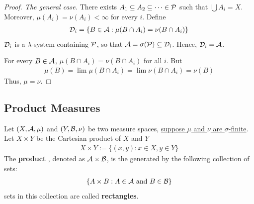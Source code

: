 \documentclass[11pt]{article}
\begin{document}
	\begin{proof}[Proof. The general case]
		There exists $A_1 \subseteq A_2 \subseteq \dots \in \mathcal{{P}}$ such that $\bigcup A_i = X$.
		Moreover, $\mu(A_i) = \nu(A_i) < \infty$ for every $i$.
		Define
		\begin{align}
			\mathcal{{D}}_i = \{B \in \mathcal{{A}} : \mu(B \cap A_i) = \nu(B \cap A_i)\}
		\end{align}
		$\mathcal{{D}}_i$ is a $\lambda$-system containing $\mathcal{{P}}$, so that $\mathcal{{A}} = \sigma(\mathcal{{P}}) \subseteq \mathcal{{D}}_i$. Hence, $\mathcal{{D}}_i = \mathcal{{A}}$.
		
		For every $B \in \mathcal{{A}}$, $\mu(B \cap A_i) = \nu(B \cap A_i)$ for all $i$. But
		\begin{align}
			\mu(B) = \lim \mu(B \cap A_i) = \lim \nu(B \cap A_i) = \nu(B)
		\end{align}
		Thus, $\mu = \nu$.
	\end{proof}
	
	\subsection{Product Measures}
	\begin{definition}
		Let $(X, \mathcal{{A}}, \mu)$ and $(Y, \mathcal{{B}}, \nu)$ be two measure spaces, \ul{suppose $\mu$ and $\nu$ are $\sigma$-finite}.
		Let $X \times Y$ be the Cartesian product of $X$ and $Y$
		\begin{align}
			X \times Y := \{(x, y) : x \in X, y \in Y\}
		\end{align}
		The \textbf{product \salg}, denoted as $\mathcal{{A}} \times \mathcal{{B}}$, is the \salg generated by the following collection of sets:
		\begin{align}
			\{A \times B : A \in \mathcal{{A}} \text{{ and }} B \in \mathcal{{B}}\}
		\end{align}
		sets in this collection are called \textbf{rectangles}.
	\end{definition}
	
\end{document}
